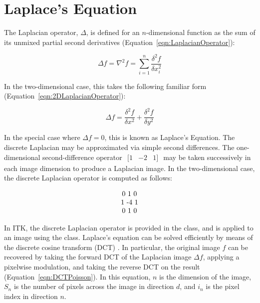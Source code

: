 
\appendix

\section{Laplace's Equation}

The Laplacian operator, $\Delta$, is defined for an $n$-dimensional function as the sum of its unmixed partial second derivatives (Equation~\ref{eqn:LaplacianOperator}):

\begin{equation}
\label{eqn:LaplacianOperator}
\Delta f = \nabla^2f = \sum_{i=1}^n \frac{\delta^2f}{\delta x_i^2}
\end{equation}

In the two-dimensional case, this takes the following familiar form (Equation~\ref{eqn:2DLaplacianOperator}):

\begin{equation}
\label{eqn:2DLaplacianOperator}
\Delta f = \frac{\delta^2 f}{\delta x^2} + \frac{\delta^2 f}{\delta y^2}
\end{equation}

In the special case where $\Delta f = 0$, this is known as Laplace's Equation. The discrete Laplacian may be approximated via simple second differences.  The one-dimensional second-difference operator $\begin{matrix}[1 & -2 & 1]\end{matrix}$ may be taken successively in each image dimension to produce a Laplacian image.  In the two-dimensional case, the discrete Laplacian operator is computed as follows:

\begin{equation}
\label{eqn:2DDiscreteLaplacianOperator}
\begin{matrix}
0 $ 1 $ 0 \\
1 $ -4 $ 1 \\
0 $ 1 $ 0
\end{matrix}
\end{equation}

In ITK, the discrete Laplacian operator is provided in the  class, and is applied to an image using the  class.  Laplace's equation can be solved efficiently by means of the discrete cosine transform (DCT) \cite{Ghiglia1998}.  In particular, the original image $f$ can be recovered by taking the forward DCT of the Laplacian image $\Delta f$, applying a pixelwise modulation, and taking the reverse DCT on the result (Equation~\ref{eqn:DCTPoisson}).  In this equation, $n$ is the dimension of the image, $S_n$ is the number of pixels across the image in direction $d$, and $i_n$ is the pixel index in direction $n$.

